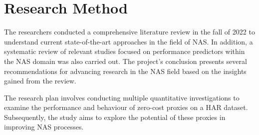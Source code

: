 
\begin{comment}
While theory and analysis can be used for heuristics and rationale when designing models,
modern deep learning is commonly researched through experiments where multiple
alternatives are compared based on relevant metrics.
This thesis employs an experimental research method to study the problem area and
answer the research questions. Generated models from the project experiments are
compared based on pre-specified evaluation criteria on dedicated training and validation
sets to advance the models iteratively. Lastly, the final models are compared and evaluated
on an unseen test set.
\end{comment}

\begin{comment}
    This project is based on a quantitative study where alternative solutions are eval-
uated based on their statistical performance on the relevant problem. Initially,relevant approaches are assessed to gather information about the state-of-the-art methods related to the problem. Based on the analysis of these methods, we hy-
pothesize what can be improved with the given methods and use this as a guideline when proposing our method. Appropriate evaluation metrics are selected before evaluating the proposed method and comparing it with the state-of-the-art approaches, and a dataset on which experiments are performed is acquired. Subsequently, experiments are carried out, and comparisons of the different methods can be obtained. Accordingly, observations and conclusions are extracted from the
experiments.
\end{comment}
\section{Research Method}
The researchers conducted a comprehensive literature review in the fall of 2022 to understand current state-of-the-art approaches in the field of \gls{NAS}. In addition, a systematic review of relevant studies focused on performance predictors within the \gls{NAS} domain was also carried out. The project's conclusion presents several recommendations for advancing research in the \gls{NAS} field based on the insights gained from the review.

The research plan involves conducting multiple quantitative investigations to examine the performance and behaviour of zero-cost proxies on a \gls{HAR} dataset. Subsequently, the study aims to explore the potential of these proxies in improving \gls{NAS} processes.


